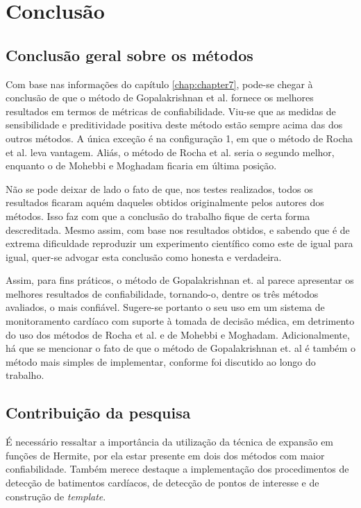 
\chapter[Conclusão]{Conclusão}
\thispagestyle{empty}
\label{chap:chapter8}

\section{Conclusão geral sobre os métodos}
Com base nas informações do capítulo \ref{chap:chapter7}, pode-se chegar à conclusão de que o método de Gopalakrishnan et al. fornece os melhores resultados em termos de métricas de confiabilidade. Viu-se que as medidas de sensibilidade e preditividade positiva deste método estão sempre acima das dos outros métodos. A única exceção é na configuração 1, em que o método de Rocha et al. leva vantagem. Aliás, o método de Rocha et al. seria o segundo melhor, enquanto o de Mohebbi e Moghadam ficaria em última posição.

Não se pode deixar de lado o fato de que, nos testes realizados, todos os resultados ficaram aquém daqueles obtidos originalmente pelos autores dos métodos. Isso faz com que a conclusão do trabalho fique de certa forma descreditada. Mesmo assim, com base nos resultados obtidos, e sabendo que é de extrema dificuldade reproduzir um experimento científico como este de igual para igual, quer-se advogar esta conclusão como honesta e verdadeira.

Assim, para fins práticos, o método de Gopalakrishnan et. al parece apresentar os melhores resultados de confiabilidade, tornando-o, dentre os três métodos avaliados, o mais confiável. Sugere-se portanto o seu uso em um sistema de monitoramento cardíaco com suporte à tomada de decisão médica, em detrimento do uso dos métodos de Rocha et al. e de Mohebbi e Moghadam. Adicionalmente, há que se mencionar o fato de que o método de Gopalakrishnan et. al é também o método mais simples de implementar, conforme foi discutido ao longo do trabalho.

\section{Contribuição da pesquisa}

É necessário ressaltar a importância da utilização da técnica de expansão em funções de Hermite, por ela estar presente em dois dos métodos com maior confiabilidade. Também merece destaque a implementação dos procedimentos de detecção de batimentos cardíacos, de detecção de pontos de interesse e de construção de \emph{template}.

